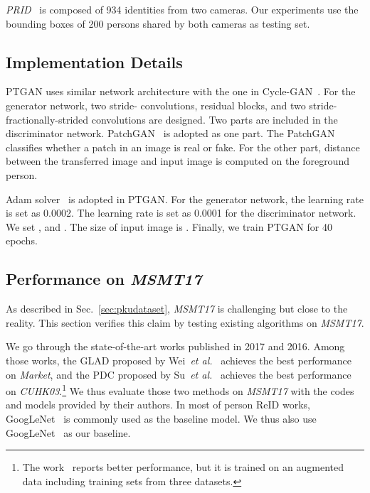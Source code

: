 \documentclass[10pt,twocolumn,letterpaper]{article}
\begin{document}
\emph{PRID}~\cite{hirzer2011person} is composed of 934 identities from two cameras. Our experiments use the bounding boxes of 200 persons shared by both cameras as testing set.


\subsection{Implementation Details}
PTGAN uses similar network architecture with the one in Cycle-GAN~\cite{zhu2017unpaired}. For the generator network, two stride- convolutions,  residual blocks, and two stride- fractionally-strided convolutions are designed. Two parts are included in the discriminator network. PatchGAN~\cite{isola2016image} is adopted as one part. The PatchGAN classifies whether a  patch in an image is real or fake. For the other part,  distance between the transferred image and input image is computed on the foreground person.

Adam solver~\cite{kinga2015method} is adopted in PTGAN. For the generator network, the learning rate is set as 0.0002. The learning rate is set as 0.0001 for the discriminator network. We set , and . The size of input image is . Finally, we train PTGAN for 40 epochs.

\subsection{Performance on \textbf{\emph{MSMT17}}}
\label{sec:MSMTTest}
As described in Sec.~\ref{sec:pkudataset}, \emph{MSMT17} is challenging but close to the reality. This section verifies this claim by testing existing algorithms on \emph{MSMT17}.

We go through the state-of-the-art works published in 2017 and 2016. Among those works, the GLAD proposed by Wei~\emph{et al.}~\cite{wei2017glad} achieves the best performance on \emph{Market}, and the PDC proposed by Su~\emph{et al.}~\cite{su2017pose} achieves the best performance on \emph{CUHK03}.\footnote{The work~\cite{liu2017hydraplus} reports better performance, but it is trained on an augmented data including training sets from three datasets.} We thus evaluate those two methods on \emph{MSMT17} with the codes and models provided by their authors. In most of person ReID works, GoogLeNet~\cite{szegedy2015going} is commonly used as the baseline model. We thus also use GoogLeNet~\cite{szegedy2015going} as our baseline.
\end{document}
